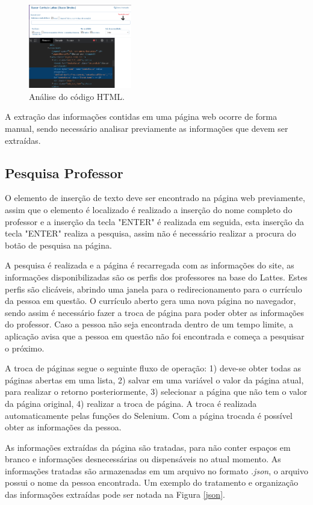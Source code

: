 \documentclass[conference]{IEEEtran}
\begin{document}
\begin{figure}[htbp]
\centerline{\includegraphics[width=0.4\textwidth]{html.png}}
\caption{Análise do código HTML.}
\label{html}
\end{figure}

A extração das informações contidas em uma página web ocorre de forma manual, sendo necessário analisar previamente as informações que devem ser extraídas.

\subsection{Pesquisa Professor}
O elemento de inserção de texto deve ser encontrado na página web previamente, assim que o elemento é localizado é realizado a inserção do nome completo do professor e a inserção da tecla "ENTER" é realizada em seguida, esta inserção da tecla "ENTER" realiza a pesquisa, assim não é necessário realizar a procura do botão de pesquisa na página.

A pesquisa é realizada e a página é recarregada com as informações do site, as informações disponibilizadas são os perfis dos professores na base do Lattes. Estes perfis são clicáveis, abrindo uma janela para o redirecionamento para o currículo da pessoa em questão. O currículo aberto gera uma nova página no navegador, sendo assim é necessário fazer a troca de página para poder obter as informações do professor. Caso a pessoa não seja encontrada dentro de um tempo limite, a aplicação avisa que a pessoa em questão não foi encontrada e começa a pesquisar o próximo.

A troca de páginas segue o seguinte fluxo de operação: 1) deve-se obter todas as páginas abertas em uma lista, 2) salvar em uma variável o valor da página atual, para realizar o retorno posteriormente, 3) selecionar a página que não tem o valor da página original, 4) realizar a troca de página. A troca é realizada automaticamente pelas funções do Selenium. Com a página trocada é possível obter as informações da pessoa.

As informações extraídas da página são tratadas, para não conter espaços em branco e informações desnecessárias ou dispensáveis no atual momento. As informações tratadas são armazenadas em um arquivo no formato \textit{.json}, o arquivo possui o nome da pessoa encontrada. Um exemplo do tratamento e organização das informações extraídas pode ser notada na Figura \ref{json}.
\end{document}
